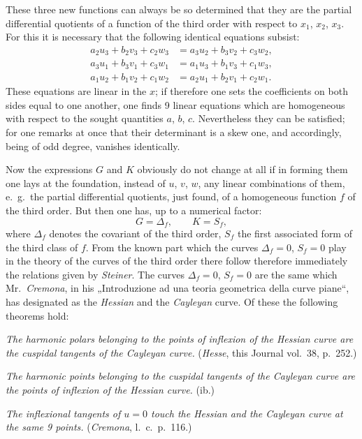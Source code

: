 \documentclass{article}
\begin{document}
These three new functions can always be so determined that they are the partial differential quotients of a function of the third order with respect to $x_{1}$, $x_{2}$, $x_{3}$. For this it is necessary that the following identical equations subsist:
\[
\begin{aligned}
a_{2} u_{3}+b_{2} v_{3}+c_{2} w_{3} &= a_{3} u_{2}+b_{3} v_{2}+c_{3} w_{2},\\
a_{3} u_{1}+b_{3} v_{1}+c_{3} w_{1} &= a_{1} u_{3}+b_{1} v_{3}+c_{1} w_{3},\\
a_{1} u_{2}+b_{1} v_{2}+c_{1} w_{2} &= a_{2} u_{1}+b_{2} v_{1}+c_{2} w_{1}.
\end{aligned}
\]
These equations are linear in the $x$; if therefore one sets the coefficients on both sides equal to one another, one finds 9 linear equations which are homogeneous with respect to the sought quantities $a$, $b$, $c$. Nevertheless they can be satisfied; for one remarks at once that their determinant is a skew one, and accordingly, being of odd degree, vanishes identically.

Now the expressions $G$ and $K$ obviously do not change at all if in forming them one lays at the foundation, instead of $u$, $v$, $w$, any linear combinations of them, e.\ g.\ the partial differential quotients, just found, of a homogeneous function $f$ of the third order. But then one has, up to a numerical factor:
\[
G = \Delta_{f}, \qquad K = S_{f},
\]
where $\Delta_{f}$ denotes the covariant of the third order, $S_{f}$ the first associated form of the third class of $f$. From the known part which the curves $\Delta_{f}=0$, $S_{f}=0$ play in the theory of the curves of the third order there follow therefore immediately the relations given by \emph{Steiner}. The curves $\Delta_{f}=0$, $S_{f}=0$ are the same which Mr.\ \emph{Cremona}, in his „Introduzione ad una teoria geometrica della curve piane“, has designated as the \emph{Hessian} and the \emph{Cayleyan} curve. Of these the following theorems hold:

\emph{The harmonic polars belonging to the points of inflexion of the Hessian curve are the cuspidal tangents of the Cayleyan curve.} (\emph{Hesse}, this Journal vol.\ 38, p.\ 252.)

\emph{The harmonic points belonging to the cuspidal tangents of the Cayleyan curve are the points of inflexion of the Hessian curve.} (ib.)

\emph{The inflexional tangents of $u=0$ touch the Hessian and the Cayleyan curve at the same 9 points.} (\emph{Cremona}, l.\ c.\ p.\ 116.)
\end{document}

